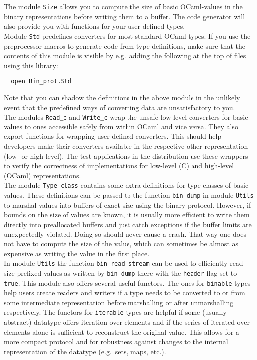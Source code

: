 \documentclass[12pt]{article}
\begin{document}
The module \verb=Size= allows you to compute the size of basic OCaml-values
in the binary representations before writing them to a buffer.  The code
generator will also provide you with functions for your user-defined types.\\

Module \verb=Std= predefines converters for most standard OCaml types.
If you use the preprocessor macros to generate code from type definitions,
make sure that the contents of this module is visible by e.g.\ adding the
following at the top of files using this library:\\

\begin{verbatim}
  open Bin_prot.Std
\end{verbatim}

Note that you can shadow the definitions in the above module in the unlikely
event that the predefined ways of converting data are unsatisfactory to you.\\

The modules \verb=Read_c= and \verb=Write_c= wrap the unsafe low-level
converters for basic values to ones accessible safely from within OCaml and
vice versa.  They also export functions for wrapping user-defined converters.
This should help developers make their converters available in the respective
other representation (low- or high-level).  The test applications in the
distribution use these wrappers to verify the correctness of implementations
for low-level (C) and high-level (OCaml) representations.\\

The module \verb=Type_class= contains some extra definitions for type
classes of basic values.  These definitions can be passed to the function
\verb=bin_dump= in module \verb=Utils= to marshal values into buffers of
exact size using the binary protocol.  However, if bounds on the size of
values are known, it is usually more efficient to write them directly into
preallocated buffers and just catch exceptions if the buffer limits are
unexpectedly violated.  Doing so should never cause a crash.  That way one
does not have to compute the size of the value, which can sometimes be almost
as expensive as writing the value in the first place.\\

In module \verb=Utils= the function \verb=bin_read_stream= can be used
to efficiently read size-prefixed values as written by \verb=bin_dump=
there with the \verb=header= flag set to \verb=true=.  This module also
offers several useful functors.  The ones for \verb=binable= types help
users create readers and writers if a type needs to be converted to or from
some intermediate representation before marshalling or after unmarshalling
respectively.  The functors for \verb=iterable= types are helpful if some
(usually abstract) datatype offers iteration over elements and if the series of
iterated-over elements alone is sufficient to reconstruct the original value.
This allows for a more compact protocol and for robustness against changes
to the internal representation of the datatype (e.g.\ sets, maps, etc.).
\end{document}
